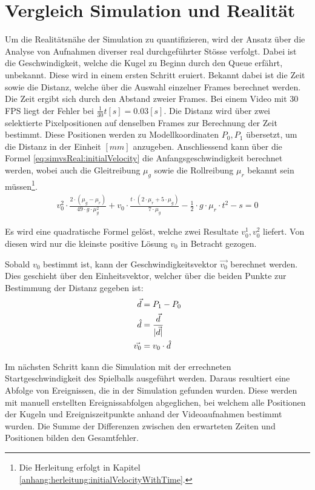 \section{Vergleich Simulation und Realität}
Um die Realitätsnähe der Simulation zu quantifizieren, wird der Ansatz über die Analyse von Aufnahmen diverser real
durchgeführter Stösse verfolgt.
Dabei ist die Geschwindigkeit, welche die Kugel zu Beginn durch den Queue erfährt, unbekannt.
Diese wird in einem ersten Schritt eruiert.
Bekannt dabei ist die Zeit sowie die Distanz, welche über die Auswahl einzelner Frames berechnet werden.
Die Zeit ergibt sich durch den Abstand zweier Frames.
Bei einem Video mit 30 FPS liegt der Fehler bei $\frac{1}{30} t [s] = 0.03 [s]$.
Die Distanz wird über zwei selektierte Pixelpositionen auf denselben Frames zur Berechnung der Zeit bestimmt.
Diese Positionen werden zu Modellkoordinaten $P_0, P_1$ übersetzt\cite{project2:pixel_to_model_coordinates},
um die Distanz in der Einheit $[mm]$ anzugeben.
Anschliessend kann über die Formel \ref{eq:simvsReal:initialVelocity} die Anfangsgeschwindigkeit berechnet
werden, wobei auch die Gleitreibung $\mu_g$ sowie die Rollreibung $\mu_r$ bekannt sein müssen\footnote{Die Herleitung
erfolgt in Kapitel \ref{anhang:herleitung:initialVelocityWithTime}.}.
\begin{align}
    v_0^2 \cdot \frac{2 \cdot (\mu_g - \mu_r)}{49 \cdot g \cdot \mu_g^2} + v_0 \cdot \frac{t \cdot (2 \cdot \mu_r + 5 \cdot \mu_g)}{7 \cdot \mu_g} - \frac{1}{2} \cdot g \cdot \mu_r \cdot t^2 - s = 0\label{eq:simvsReal:initialVelocity}
\end{align}

Es wird eine quadratische Formel gelöst, welche zwei Resultate $v^1_0, v^2_0$ liefert. Von diesen wird nur die
kleinste positive Lösung $v_0$ in Betracht gezogen.

Sobald $v_0$ bestimmt ist, kann der Geschwindigkeitsvektor $\vec{v_0}$ berechnet werden. Dies geschieht über den Einheitsvektor,
welcher über die beiden Punkte zur Bestimmung der Distanz gegeben ist:
\begin{align}
    \vec{d} &= P_1 - P_0\\
    \hat{d} &= \frac{\vec{d}}{\lvert \vec{d} \rvert}\\
    \vec{v_0} &= v_0 \cdot \hat{d}
\end{align}

Im nächsten Schritt kann die Simulation mit der errechneten Startgeschwindigkeit des Spielballs ausgeführt werden.
Daraus resultiert eine Abfolge von Ereignissen, die in der Simulation gefunden wurden.
Diese werden mit manuell erstellten Ereignissabfolgen abgeglichen, bei welchem alle Positionen der Kugeln und Ereigniszeitpunkte
anhand der Videoaufnahmen bestimmt wurden.
Die Summe der Differenzen zwischen den erwarteten Zeiten und Positionen bilden den Gesamtfehler.

